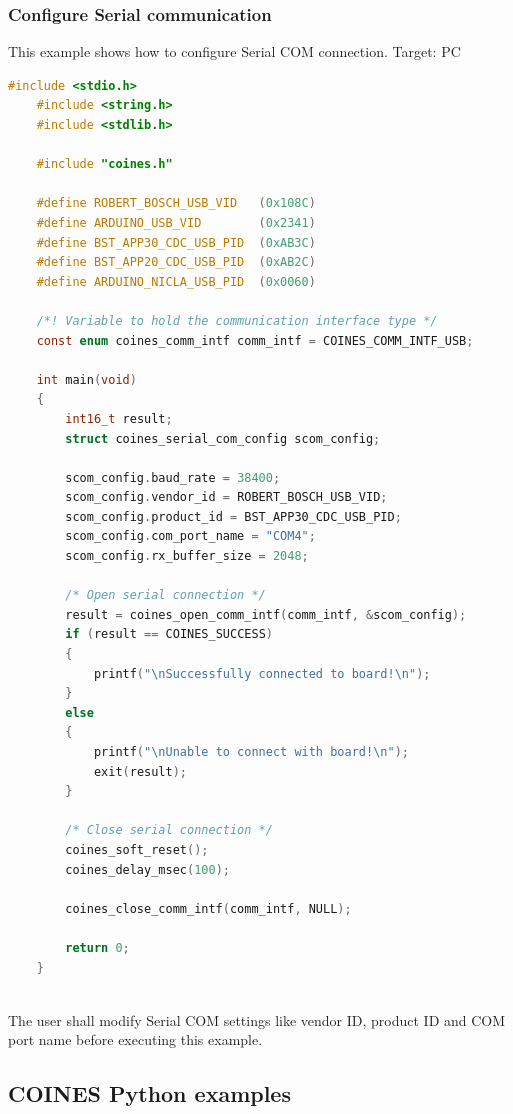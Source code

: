 \documentclass[11pt,headings=small]{scrartcl}
\begin{document}
\subsubsection{Configure Serial communication}\label{serialComConfig}
This example shows how to configure Serial COM connection.
\newline Target: PC
\begin{lstlisting}[language=c]
	#include <stdio.h>
	#include <string.h>
	#include <stdlib.h>
	
	#include "coines.h"
	
	#define ROBERT_BOSCH_USB_VID   (0x108C)
	#define ARDUINO_USB_VID        (0x2341)
	#define BST_APP30_CDC_USB_PID  (0xAB3C)
	#define BST_APP20_CDC_USB_PID  (0xAB2C)
	#define ARDUINO_NICLA_USB_PID  (0x0060)
	
	/*! Variable to hold the communication interface type */
	const enum coines_comm_intf comm_intf = COINES_COMM_INTF_USB;
	
	int main(void)
	{
		int16_t result;
		struct coines_serial_com_config scom_config;
	
		scom_config.baud_rate = 38400;
		scom_config.vendor_id = ROBERT_BOSCH_USB_VID;
		scom_config.product_id = BST_APP30_CDC_USB_PID;
		scom_config.com_port_name = "COM4";
		scom_config.rx_buffer_size = 2048;
	
		/* Open serial connection */
		result = coines_open_comm_intf(comm_intf, &scom_config);
		if (result == COINES_SUCCESS)
		{
			printf("\nSuccessfully connected to board!\n");
		}
		else
		{
			printf("\nUnable to connect with board!\n");
			exit(result);
		}
	
		/* Close serial connection */
		coines_soft_reset();
		coines_delay_msec(100);
	
		coines_close_comm_intf(comm_intf, NULL);
	
		return 0;
	}
	
\end{lstlisting}
The user shall modify Serial COM settings like vendor ID, product ID and COM port name before executing this example.
\subsection{COINES Python examples}
\end{document}
